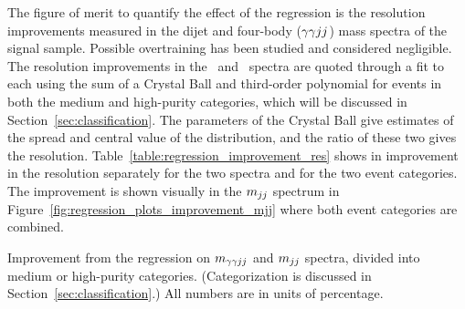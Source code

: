 The figure of merit to quantify the effect of the regression is the resolution improvements
measured in the dijet and four-body ($\gamma\gamma jj$) mass spectra of the signal sample.
Possible overtraining has been studied and considered negligible.
The resolution improvements in the \Mjj\, and \Mggjj\, spectra are quoted through a
fit to each using the sum of a Crystal Ball and third-order polynomial for events
in both the medium and high-purity categories, which will be discussed in Section~\ref{sec:classification}.
The parameters of the Crystal Ball give estimates
of the spread and central value of the distribution, and the ratio of these two gives the resolution.
Table~\ref{table:regression_improvement_res} shows in improvement in the resolution separately
for the two spectra and for the two event categories.
The improvement is shown visually in the $m_{jj}$ spectrum in
Figure~\ref{fig:regression_plots_improvement_mjj} where both event categories are combined.

\begin{table}[ht]
  \centering
  \renewcommand{\arraystretch}{1.4}
  \caption{Improvement from the regression on $m_{\gamma\gamma jj}$ and $m_{jj}$ spectra, divided into medium
or high-purity categories. (Categorization is discussed in Section~\ref{sec:classification}.)
All numbers are in units of percentage.}
  
  \label{table:regression_improvement_res}
\end{table}

